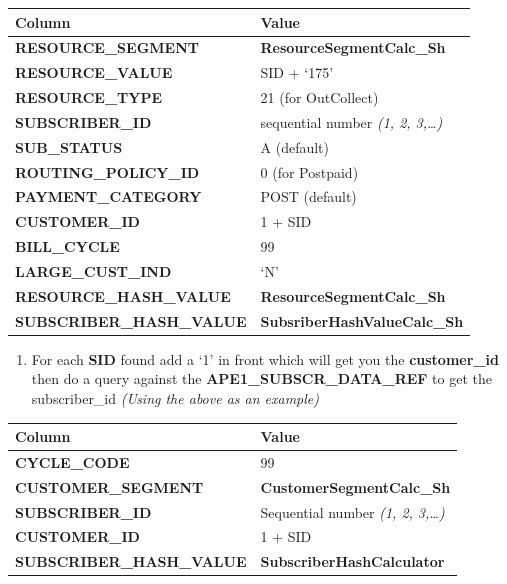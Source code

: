 \documentclass[12pt,twoside]{article}
\begin{document}
\begin{center}
\begin{tabular}{ll}
\hline
 \textbf{Column}                   &  \textbf{Value}                        \\
\hline
 \textbf{RESOURCE\_SEGMENT}        &  \textbf{ResourceSegmentCalc\_Sh}      \\
 \textbf{RESOURCE\_VALUE}          &  SID + `175'                           \\
 \textbf{RESOURCE\_TYPE}           &  21 (for OutCollect)                   \\
 \textbf{SUBSCRIBER\_ID}           &  sequential number \emph{(1, 2, 3,…)}  \\
 \textbf{SUB\_STATUS}              &  A (default)                           \\
 \textbf{ROUTING\_POLICY\_ID}      &  0 (for Postpaid)                      \\
 \textbf{PAYMENT\_CATEGORY}        &  POST (default)                        \\
 \textbf{CUSTOMER\_ID}             &  1 + SID                               \\
 \textbf{BILL\_CYCLE}              &  99                                    \\
 \textbf{LARGE\_CUST\_IND}         &  ‘N’                                   \\
 \textbf{RESOURCE\_HASH\_VALUE}    &  \textbf{ResourceSegmentCalc\_Sh}      \\
 \textbf{SUBSCRIBER\_HASH\_VALUE}  &  \textbf{SubsriberHashValueCalc\_Sh}   \\
\hline
\end{tabular}
\end{center}


   \normalsize
\begin{enumerate}
\item For each \textbf{SID} found add a `1' in front which will get you the \textbf{customer\_id} then do a query against the \textbf{APE1\_SUBSCR\_DATA\_REF} to get the subscriber\_id \emph{(Using the above as an example)}
\end{enumerate}
   \footnotesize

\begin{center}
\begin{tabular}{ll}
\hline
 \textbf{Column}                   &  \textbf{Value}                        \\
\hline
 \textbf{CYCLE\_CODE}              &  99                                    \\
 \textbf{CUSTOMER\_SEGMENT}        &  \textbf{CustomerSegmentCalc\_Sh}      \\
 \textbf{SUBSCRIBER\_ID}           &  Sequential number \emph{(1, 2, 3,…)}  \\
 \textbf{CUSTOMER\_ID}             &  1 + SID                               \\
 \textbf{SUBSCRIBER\_HASH\_VALUE}  &  \textbf{SubscriberHashCalculator}     \\
\hline
\end{tabular}
\end{center}
\end{document}
